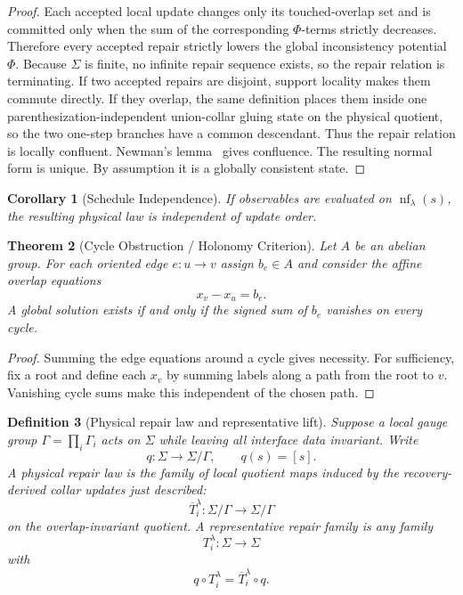 \documentclass[11pt]{article}
\newtheorem{theorem}{Theorem}[section]
\newtheorem{corollary}[theorem]{Corollary}
\newtheorem{definition}[theorem]{Definition}
\newcommand{\nf}{\operatorname{nf}}
\begin{document}
\begin{proof}
Each accepted local update changes only its touched-overlap set and is committed only when the sum
of the corresponding \(\Phi\)-terms strictly decreases. Therefore every accepted repair strictly
lowers the global inconsistency potential \(\Phi\). Because \(\Sigma\) is finite, no infinite
repair sequence exists, so the repair relation is terminating. If two accepted repairs are
disjoint, support locality makes them commute directly. If they overlap, the same definition places
them inside one parenthesization-independent union-collar gluing state on the physical quotient,
so the two one-step branches have a common descendant. Thus the repair relation is locally
confluent. Newman's lemma~\cite{newman42} gives confluence. The resulting normal form is
unique. By assumption it is a globally consistent state.
\end{proof}

\begin{corollary}[Schedule Independence]
If observables are evaluated on $\nf_\lambda(s)$, the resulting physical law is independent of update order.
\end{corollary}

\begin{theorem}[Cycle Obstruction / Holonomy Criterion]\label{thm:holonomy}
Let $A$ be an abelian group. For each oriented edge $e:u\to v$ assign $b_e\in A$ and consider the affine overlap equations
\[
x_v-x_u=b_e.
\]
A global solution exists if and only if the signed sum of $b_e$ vanishes on every cycle.
\end{theorem}

\begin{proof}
Summing the edge equations around a cycle gives necessity. For sufficiency, fix a root and define each $x_v$ by summing labels along a path from the root to $v$. Vanishing cycle sums make this independent of the chosen path.
\end{proof}

\begin{definition}[Physical repair law and representative lift]\label{def:physicalrepair}
Suppose a local gauge group $\Gamma=\prod_i \Gamma_i$ acts on $\Sigma$ while leaving all interface
data invariant. Write
\[
q:\Sigma\to\Sigma/\Gamma,
\qquad
q(s)=[s].
\]
A physical repair law is the family of local quotient maps induced by the
recovery-derived collar updates just described:
\[
\overline T_i^\lambda:\Sigma/\Gamma\to\Sigma/\Gamma
\]
on the overlap-invariant quotient. A representative repair family is any family
\[
T_i^\lambda:\Sigma\to\Sigma
\]
with
\[
q\circ T_i^\lambda=\overline T_i^\lambda\circ q.
\]
\end{definition}
\end{document}

